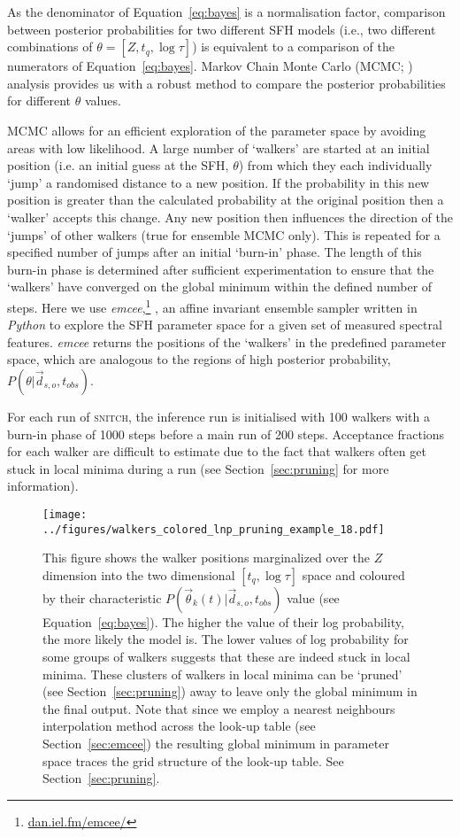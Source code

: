 \documentclass[useAMS,usenatbib]{mn2e}
\def\referee		{\color{refer}}
\begin{document}
{\referee As the denominator of Equation~\ref{eq:bayes} is a normalisation factor, comparison between posterior probabilities for two different SFH models (i.e., two different combinations of $\theta = [Z, t_q, \log \tau]$) is equivalent to a comparison of the numerators of Equation~\ref{eq:bayes}. Markov Chain Monte Carlo (MCMC; \citealt{mackay03, emcee13, GW10}) analysis provides us with a robust method to compare the posterior probabilities for different $\theta$ values.

MCMC allows for an efficient exploration of the parameter space by avoiding areas with low likelihood. A large number of `walkers' are started at an initial position (i.e. an initial guess at the SFH, $\theta$) from which they each individually `jump' a randomised distance to a new position. If the probability in this new position is greater than the calculated probability at the original position then a `walker' accepts this change. Any new position then influences the direction of the  `jumps' of other walkers (true for ensemble MCMC only). This is repeated for a specified number of jumps after an initial `burn-in' phase. The length of this burn-in phase is determined after sufficient experimentation to ensure that the `walkers' have converged on the global minimum within the defined number of steps. Here we use \emph{emcee},\footnote{\url{dan.iel.fm/emcee/}} \citep{emcee13}, an affine invariant ensemble sampler written in \emph{Python} to explore the SFH parameter space for a given set of measured spectral features. \emph{emcee} returns the positions of the `walkers' in the predefined parameter space, which are analogous to the regions of high posterior probability, $P(\theta|\vec{d}_{s,o}, t_{obs})$.

For each run of \textsc{snitch}, the inference run is initialised with 100 walkers with a burn-in phase of 1000 steps before a main run of 200 steps. Acceptance fractions for each walker are difficult to estimate due to the fact that walkers often get stuck in local minima during a run (see Section~\ref{sec:pruning} for more information). 

}

\begin{figure}
\centering
\texttt{[image: ../figures/walkers\_colored\_lnp\_pruning\_example\_18.pdf]}
\caption{This figure shows the walker positions marginalized over the $Z$ dimension into the two dimensional $[t_q, \log\tau]$ space and coloured by their characteristic $P(\vec{\theta}_k (t)|\vec{d}_{s,o}, t_{obs})$ value (see Equation~\ref{eq:bayes}). The higher the value of their log probability, the more likely the model is. The lower values of log probability for some groups of walkers suggests that these are indeed stuck in local minima. These clusters of walkers in local minima can be `pruned' (see Section~\ref{sec:pruning}) away to leave only the global minimum in the final output. Note that since we employ a nearest neighbours interpolation method across the look-up table (see Section~\ref{sec:emcee}) the resulting global minimum in parameter space traces the grid structure of the look-up table. See Section~\ref{sec:pruning}.}
\label{fig:localminima}
\end{figure}
\end{document}
